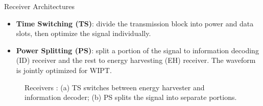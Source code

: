 \documentclass[xcolor={table}]{beamer}
\begin{document}
\begin{frame}[fragile=singleslide,t]
\begin{columns}[onlytextwidth,T]
\begin{column}{.47\textwidth}
\begin{block}{Receiver Architectures}
\begin{itemize}
  \item \textbf{Time Switching (TS)}: divide the transmission block into power and data slots, then optimize the signal individually.
  \item \textbf{Power Splitting (PS)}: split a portion of the signal to information decoding (ID) receiver and the rest to energy harvesting (EH) receiver. The waveform is jointly optimized for WIPT.
\end{itemize}
\begin{figure}
  \centering
  \caption{Receivers \citep{Clerckx2019}: (a) TS switches between energy harvester and information decoder; (b) PS splits the signal into separate portions.}\label{fig:receivers}
\end{figure}
\end{block}


\end{column}
\end{columns}
\end{frame}
\end{document}
